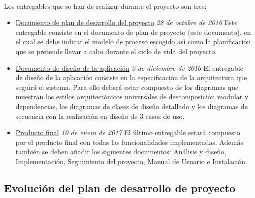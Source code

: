 \documentclass{article}
\begin{document}
            \paragraph{}
            Los entregables que se han de realizar durante el proyecto son tres:
            
            \begin{itemize}
          		\item 
                	\underline{Documento de plan de desarrollo del proyecto} 
                    \emph{28 de octubre de 2016}
                    Este entregable consiste en el documento de plan de proyecto (este documento), en el cual se debe indicar el modelo de proceso escogido así como la planificación que se pretende llevar a cabo durante el ciclo de vida del proyecto.
                	

          		\item 
                	\underline{Documento de diseño de la aplicación} 
                    \emph{2 de diciembre de 2016} 
                    El entregable de diseño de la aplicación consiste en la especificación de la arquitectura que seguirá el sistema. Para ello deberá estar compuesto de los diagramas que muestran los estilos arquitectónicos universales de descomposición modular y dependencias, los diagramas de clases de diseño detallado y los diagramas de secuencia con la realización en diseño de 3 casos de uso.
					
          		\item 
                	\underline{Producto final} 
                    \emph{10 de enero de 2017}
					El último entregable estará compuesto por el producto final con todas las funcionalidades implementadas. Además también se deben añadir los siguientes documentos: Análisis y diseño, Implementación, Seguimiento del proyecto, Manual de Usuario e Instalación.
          \end{itemize}
           
            
            
		
        \subsection{Evolución del plan de desarrollo de proyecto}
        
\end{document}

